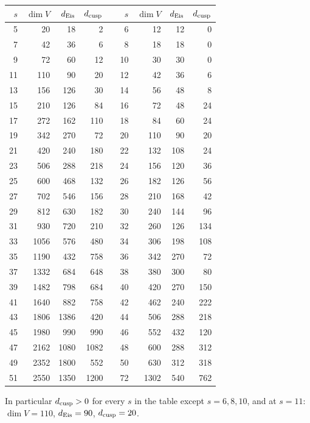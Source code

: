 \begin{theorem}[Dimensions]
\begin{center}\small
\begin{longtable}{rrrrcrrrr}\toprule
$s$ & $\dim V$ & $d_{\rm Eis}$ & $d_{\rm cusp}$ && $s$ & $\dim V$ & $d_{\rm Eis}$ & $d_{\rm cusp}$\\\midrule\endhead
5 & 20 & 18 & 2 && 6 & 12 & 12 & 0\\
7 & 42 & 36 & 6 && 8 & 18 & 18 & 0\\
9 & 72 & 60 & 12 && 10 & 30 & 30 & 0\\
11 & 110 & 90 & 20 && 12 & 42 & 36 & 6\\
13 & 156 & 126 & 30 && 14 & 56 & 48 & 8\\
15 & 210 & 126 & 84 && 16 & 72 & 48 & 24\\
17 & 272 & 162 & 110 && 18 & 84 & 60 & 24\\
19 & 342 & 270 & 72 && 20 & 110 & 90 & 20\\
21 & 420 & 240 & 180 && 22 & 132 & 108 & 24\\
23 & 506 & 288 & 218 && 24 & 156 & 120 & 36\\
25 & 600 & 468 & 132 && 26 & 182 & 126 & 56\\
27 & 702 & 546 & 156 && 28 & 210 & 168 & 42\\
29 & 812 & 630 & 182 && 30 & 240 & 144 & 96\\
31 & 930 & 720 & 210 && 32 & 260 & 126 & 134\\
33 & 1056 & 576 & 480 && 34 & 306 & 198 & 108\\
35 & 1190 & 432 & 758 && 36 & 342 & 270 & 72\\
37 & 1332 & 684 & 648 && 38 & 380 & 300 & 80\\
39 & 1482 & 798 & 684 && 40 & 420 & 270 & 150\\
41 & 1640 & 882 & 758 && 42 & 462 & 240 & 222\\
43 & 1806 & 1386 & 420 && 44 & 506 & 288 & 218\\
45 & 1980 & 990 & 990 && 46 & 552 & 432 & 120\\
47 & 2162 & 1080 & 1082 && 48 & 600 & 288 & 312\\
49 & 2352 & 1800 & 552 && 50 & 630 & 312 & 318\\
51 & 2550 & 1350 & 1200 && 72 & 1302 & 540 & 762\\
\bottomrule
\end{longtable}
\end{center}
In particular $d_{\rm cusp}>0$ for every $s$ in the table except $s=6,8,10$, and at $s=11$: $\dim V=110$, $d_{\rm Eis}=90$, $d_{\rm cusp}=20$.
\end{theorem}
